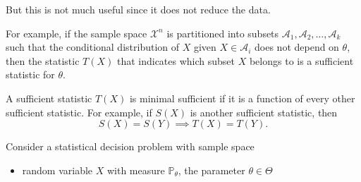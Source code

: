 But this is not much useful since it does not reduce the data.

For example, if the sample space $\mathcal{X}^n$ is partitioned into subsets $\mathcal{A}_1, \mathcal{A}_2, \ldots, \mathcal{A}_k$ such that the conditional distribution of $X$ given $X \in \mathcal{A}_i$ does not depend on $\theta$, then the statistic $T(X)$ that indicates which subset $X$ belongs to is a sufficient statistic for $\theta$.

\begin{definition}
    A sufficient statistic $T(X)$ is minimal sufficient if it is a function of every other sufficient statistic. 
    For example, if $S(X)$ is another sufficient statistic, then 
    \[ S(X) = S(Y) \implies T(X) = T(Y). \]
\end{definition}

\begin{theorem}
    Consider a statistical decision problem with sample space 
    \begin{itemize}
        \item random variable $X$ with measure $\mathbb{P}_\theta$, the parameter 
        $\theta \in \Theta$ 
    \end{itemize}    
\end{theorem}

